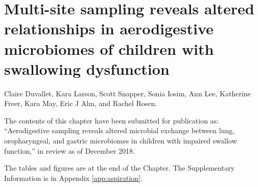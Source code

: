 
\graphicspath{{aspiration/figures/}}

\chapter{Multi-site sampling reveals altered relationships in aerodigestive microbiomes of children with swallowing dysfunction}\label{chap:aspiration}

Claire Duvallet, Kara Larson, Scott Snapper, Sonia Iosim, Ann Lee, Katherine Freer, Kara May, Eric J Alm, and Rachel Rosen.

\bigskip
\bigskip
\noindent
The contents of this chapter have been submitted for publication as: ``Aerodigestive sampling reveals altered microbial exchange between lung, oropharyngeal, and gastric microbiomes in children with impaired swallow function,'' in review as of December 2018.

\bigskip
\bigskip
\noindent
The tables and figures are at the end of the Chapter. The Supplementary Information is in Appendix \ref{app:aspiration}.

\clearpage

